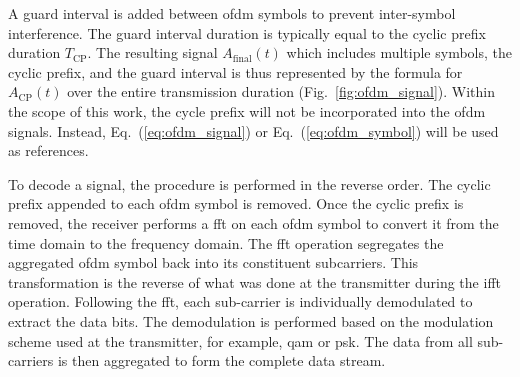 A guard interval is added between \acrshort{ofdm} symbols to prevent inter-symbol interference. The guard interval duration is typically equal to the cyclic prefix duration \( T_{\text{CP}} \).
The resulting signal \( A_{\text{final}}(t) \) which includes multiple symbols, the cyclic prefix, and the guard interval is thus represented by the formula for \( A_{\text{CP}}(t) \) over the entire transmission duration (Fig.~\ref{fig:ofdm_signal}). Within the scope of this work, the cycle prefix will not be incorporated into the \Gls{ofdm} signals. Instead, Eq.~(\ref{eq:ofdm_signal}) or Eq.~(\ref{eq:ofdm_symbol}) will be used as references.


To decode a signal, the procedure is performed in the reverse order.
The cyclic prefix appended to each \acrshort{ofdm} symbol is removed. 
Once the cyclic prefix is removed, the receiver performs a \Gls{fft} on each \acrshort{ofdm} symbol to convert it from the time domain to the frequency domain. The \Gls{fft} operation segregates the aggregated \acrshort{ofdm} symbol back into its constituent subcarriers. This transformation is the reverse of what was done at the transmitter during the \Gls{ifft} operation. Following the \Gls{fft}, each sub-carrier is individually demodulated to extract the data bits. The demodulation is performed based on the modulation scheme used at the transmitter, for example, \acrshort{qam} or \acrshort{psk}. The data from all sub-carriers is then aggregated to form the complete data stream.